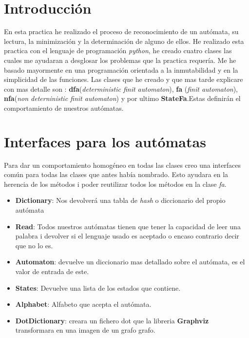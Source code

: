 \documentclass{article}
\begin{document}
    \section{Introducción}
    En esta practica he realizado el proceso de reconocimiento de un autómata, su lectura, la minimización y la determinación de alguno de ellos. He realizado esta practica con el lenguaje de programación \textit{python}, he creado cuatro clases las cuales me ayudaran a desglosar los problemas que la practica requería. Me he basado mayormente en una programación orientada a la inmutabilidad y en la simplicidad de las funciones. Las clases que he creado y que mas tarde explicare con mas detalle son : \textbf{dfa}(\textit{deterministic finit automaton}), \textbf{fa} (\textit{finit automaton}), \textbf{nfa}(\textit{non deterninistic finit automaton}) y por ultimo  \textbf{StateFa}.Estas definirán el comportamiento de nuestros autómatas.



    \section{Interfaces para los autómatas}
    Para dar un comportamiento homogéneo en todas las clases creo una interfaces común para todas las clases que antes había nombrado. Esto ayudara en la herencia de los métodos i poder reutilizar todos los métodos en la clase \textit{fa}.
    \begin{itemize}
        \item \textbf{Dictionary}: Nos devolverá una tabla de \textit{hash} o diccionario del propio autómata
        \item \textbf{Read}: Todos nuestros autómatas tienen que tener la capacidad de leer una palabra i devolver si el lenguaje usado es aceptado o encaso contrario decir que no lo es.
        \item \textbf{Automaton}: devuelve un diccionario mas detallado sobre el autómata, es el valor de entrada de este.
        \item \textbf{States}: Devuelve una lista de los estados que contiene.
        \item \textbf{Alphabet}: Alfabeto que acepta el autómata.
        \item \textbf{DotDictionary}: creara un fichero dot que la libreria \textbf{Graphviz} transformara en una imagen de un grafo grafo.
    \end{itemize}
\end{document}
